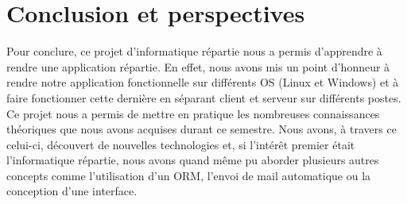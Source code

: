 \documentclass[a4paper,10pt]{report}
\begin{document}
\chapter{Conclusion et perspectives}
    
    
    Pour conclure, ce projet d'informatique répartie nous a permis d'apprendre à rendre une application répartie. En effet, nous avons mis un point d'honneur à rendre notre application fonctionnelle sur différents OS (Linux et Windows) et à faire fonctionner cette dernière en séparant client et serveur sur différents postes. Ce projet nous a permis de mettre en pratique les nombreuses connaissances théoriques que nous avons acquises durant ce semestre. Nous avons, à travers ce celui-ci, découvert de nouvelles technologies et, si l'intérêt premier était l'informatique répartie, nous avons quand même pu aborder plusieurs autres concepts comme l'utilisation d'un ORM, l'envoi de mail automatique ou la conception d'une interface.
\end{document}
